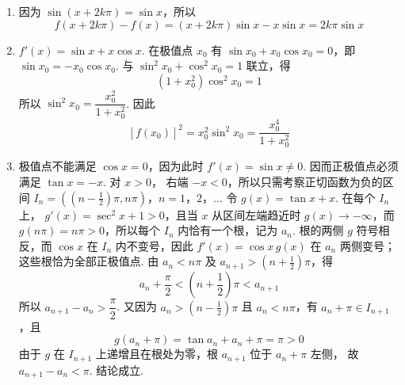 \begin{solution}
\begin{enumerate}
\item 因为 \(\sin(x+2k\pi)=\sin x\)，所以
\[
f(x+2k\pi)-f(x)
=(x+2k\pi)\sin x-x\sin x
=2k\pi\sin x
\]
\item \(f'(x)=\sin x+x\cos x\). 在极值点 \(x_0\) 有
\(\sin x_0+x_0\cos x_0=0\)，即 \(\sin x_0=-x_0\cos x_0\). 与
\(\sin^2x_0+\cos^2x_0=1\) 联立，得
\[
(1+x_0^2)\cos^2x_0=1
\]
所以 \(\sin^2x_0=\dfrac{x_0^2}{1+x_0^2}\).
因此
\[
\left[f(x_0)\right]^2=x_0^2\sin^2x_0
=\frac{x_0^4}{1+x_0^2}
\]
\item 极值点不能满足 \(\cos x=0\)，因为此时
\(f'(x)=\sin x\ne0\). 因而正极值点必须满足 \(\tan x=-x\). 对 \(x>0\)，
右端 \(-x<0\)，所以只需考察正切函数为负的区间
\(I_n=\left(\left(n-\frac12\right)\pi,n\pi\right)\)，\(n=1\)，\(2\)，\(\ldots\)
令 \(g(x)=\tan x+x\). 在每个 \(I_n\) 上，
\(g'(x)=\sec^2x+1>0\)，且当 \(x\) 从区间左端趋近时 \(g(x)\to-\infty\)，而
\(g(n\pi)=n\pi>0\)，所以每个 \(I_n\) 内恰有一个根，记为 \(a_n\). 根的两侧
\(g\) 符号相反，而 \(\cos x\) 在 \(I_n\) 内不变号，因此
\(f'(x)=\cos x\,g(x)\) 在 \(a_n\) 两侧变号；这些根恰为全部正极值点. 由
\(a_n<n\pi\) 及 \(a_{n+1}>\left(n+\frac12\right)\pi\)，得
\[
a_n+\frac\pi2<\left(n+\frac12\right)\pi<a_{n+1}
\]
所以 \(a_{n+1}-a_n>\dfrac\pi2\). 又因为
\(a_n>\left(n-\frac12\right)\pi\) 且 \(a_n<n\pi\)，有 \(a_n+\pi\in I_{n+1}\)，且
\[
g(a_n+\pi)=\tan a_n+a_n+\pi=\pi>0
\]
由于 \(g\) 在 \(I_{n+1}\) 上递增且在根处为零，根 \(a_{n+1}\) 位于 \(a_n+\pi\) 左侧，
故 \(a_{n+1}-a_n<\pi\). 结论成立.
\end{enumerate}
\end{solution}
